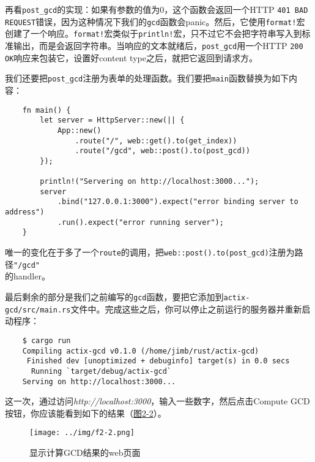 再看\texttt{post\_gcd}的实现：如果有参数的值为0，这个函数会返回一个HTTP \texttt{401 BAD REQUEST}错误，因为这种情况下我们的\texttt{gcd}函数会panic。然后，它使用\texttt{format!}宏创建了一个响应。\texttt{format!}宏类似于\texttt{println!}宏，只不过它不会把字符串写入到标准输出，而是会返回字符串。当响应的文本就绪后，\texttt{post\_gcd}用一个HTTP \texttt{200 OK}响应来包装它，设置好content type之后，就把它返回到请求方。

我们还要把\texttt{post\_gcd}注册为表单的处理函数。我们要把\texttt{main}函数替换为如下内容：
\begin{verbatim}
    fn main() {
        let server = HttpServer::new(|| {
            App::new()
                .route("/", web::get().to(get_index))
                .route("/gcd", web::post().to(post_gcd))
        });

        println!("Servering on http://localhost:3000...");
        server
            .bind("127.0.0.1:3000").expect("error binding server to address")
            .run().expect("error running server");
    }
\end{verbatim}

唯一的变化在于多了一个\texttt{route}的调用，把\texttt{web::post().to(post\_gcd)}注册为路径\texttt{"/gcd"}\\
的handler。

最后剩余的部分是我们之前编写的\texttt{gcd}函数，要把它添加到\texttt{actix-gcd/src/main.rs}文件中。完成这些之后，你可以停止之前运行的服务器并重新启动程序：
\begin{verbatim}
    $ cargo run
    Compiling actix-gcd v0.1.0 (/home/jimb/rust/actix-gcd)
     Finished dev [unoptimized + debuginfo] target(s) in 0.0 secs
      Running `target/debug/actix-gcd`
    Serving on http://localhost:3000...
\end{verbatim}

这一次，通过访问\emph{http://localhost:3000}，输入一些数字，然后点击Compute GCD按钮，你应该能看到如下的结果（\hyperref[f2-2]{图2-2}）。
\begin{figure}[htbp]
    \centering
    \texttt{[image: ../img/f2-2.png]}
    \caption{显示计算GCD结果的web页面}
    \label{f2-2}
\end{figure}


